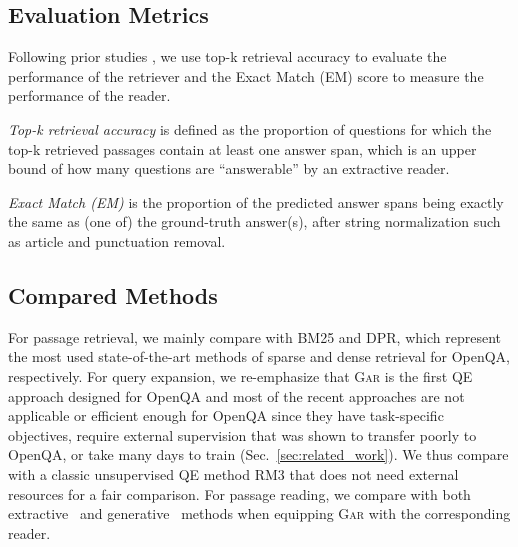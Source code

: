 \documentclass[11pt,a4paper]{article}
\newcommand{\ours}{\textsc{Gar}\xspace}
\begin{document}
\subsection{Evaluation Metrics}
Following prior studies \cite{karpukhin2020dense}, we use top-k retrieval accuracy to evaluate the performance of the retriever and the Exact Match (EM) score to measure the performance of the reader.

\textit{Top-k retrieval accuracy} is defined as the proportion of questions for which the top-k retrieved passages contain at least one answer span, which is an upper bound of how many questions are ``answerable'' by an extractive reader.

\textit{Exact Match (EM)} is the proportion of the predicted answer spans being exactly the same as (one of) the ground-truth answer(s), after string normalization such as article and punctuation removal.

\subsection{Compared Methods} 
For passage retrieval, we mainly compare with BM25 and DPR, which represent the most used state-of-the-art methods of sparse and dense retrieval for OpenQA, respectively.
For query expansion, we re-emphasize that \ours is the first QE approach designed for OpenQA and most of the recent approaches are not applicable or efficient enough for OpenQA since they have task-specific objectives, require external supervision that was shown to transfer poorly to OpenQA, or take many days to train (Sec.~\ref{sec:related_work}). We thus compare with a classic unsupervised QE method RM3 \cite{abdul2004umass} that does not need external resources for a fair comparison.
For passage reading, we compare with both extractive~\citep{min-etal-2019-discrete,asai2019learning,lee-etal-2019-latent,min2019knowledge,guu2020realm,karpukhin2020dense}  and generative~\citep{brown2020language,roberts2020much,min2020ambigqa,lewis2020retrieval,izacard2020leveraging}  methods when equipping \ours with the corresponding reader.
\end{document}

